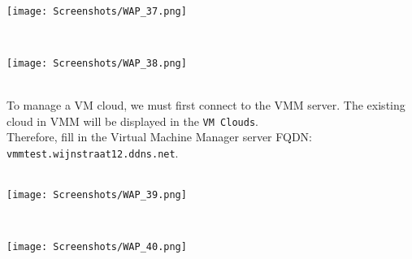 $\;$ \\ \\
\noindent\begin{minipage}{\textwidth}
    \centering
    \texttt{[image: Screenshots/WAP\_37.png]}
\end{minipage}
$\;$ \\ \\
\noindent\begin{minipage}{\textwidth}
    \centering
    \texttt{[image: Screenshots/WAP\_38.png]}
\end{minipage}
$\;$ \\ \\
To manage a VM cloud, we must first connect to the VMM server. The existing cloud in VMM will be displayed in the \texttt{VM Clouds}.  \\
Therefore, fill in the Virtual Machine Manager server FQDN: \texttt{vmmtest.wijnstraat12.ddns.net}.
$\;$ \\ \\
\noindent\begin{minipage}{\textwidth}
    \centering
    \texttt{[image: Screenshots/WAP\_39.png]}
\end{minipage}
$\;$ \\ \\
\noindent\begin{minipage}{\textwidth}
    \centering
    \texttt{[image: Screenshots/WAP\_40.png]}
\end{minipage}

